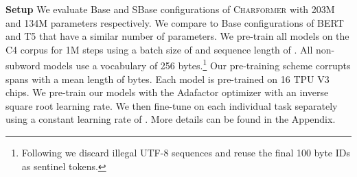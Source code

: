 \documentclass{article} \usepackage{iclr2022_conference,times}
\newcommand{\charformer}{\textsc{Charformer}\xspace}
\begin{document}
\noindent \textbf{Setup}  We evaluate Base and SBase configurations of \charformer with 203M and 134M parameters respectively. We compare to Base configurations of BERT and T5 that have a similar number of parameters. We pre-train all models on the C4 corpus for 1M steps using a batch size of  and sequence length of . All non-subword models use a vocabulary of 256 bytes.\footnote{Following \citet{Xue2021byt5} we discard illegal UTF-8 sequences and reuse the final 100 byte IDs as sentinel tokens.}
Our pre-training scheme corrupts spans with a mean length of  bytes. Each model is pre-trained on 16 TPU V3 chips. We pre-train our models with the Adafactor optimizer with an inverse square root learning rate. We then fine-tune on each individual task separately using a constant learning rate of . More details can be found in the Appendix.
\end{document}
